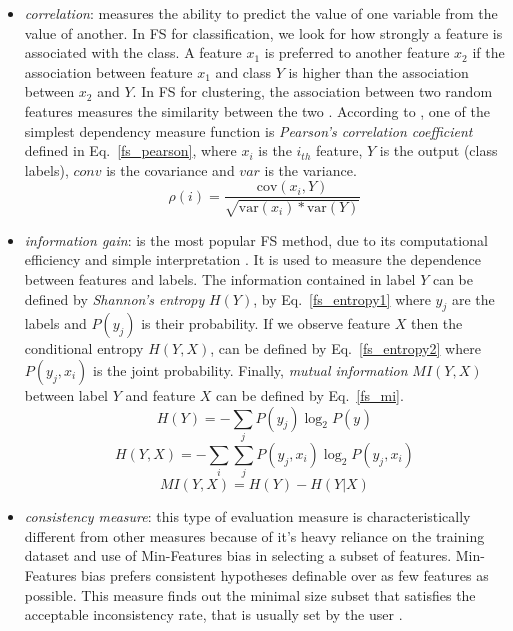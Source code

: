 \begin{itemize}
  \item \textit{correlation}: measures the ability to predict the value of one variable from the value of another. In FS for classification, we look for how strongly a feature is associated with the class. A feature $x_{1}$ is preferred to another feature $x_{2}$ if the association between feature $x_{1}$ and class $Y$ is higher than the association between $x_{2}$ and $Y$. In FS for clustering, the association between two random features measures the similarity between the two \citep{liu2005toward}. According to \citet{guyon2003introduction}, one of the simplest dependency measure function is \textit{Pearson's correlation coefficient} defined in Eq.~\ref{fs_pearson}, where $x_{i}$ is the $i_{th}$ feature, $Y$ is the output (class labels), $conv$ is the covariance and $var$ is the variance.
  \begin{equation}\label{fs_pearson}
    \rho(i) = \frac{\text{cov}(x_{i},Y)}{\sqrt{\text{var}(x_{i})*\text{var}(Y)}}
  \end{equation}
  \item \textit{information gain}: is the most popular FS method, due to its computational efficiency and simple interpretation \citep{tang2014feature}. It is used to measure the dependence between features and labels. The information contained in label $Y$ can be defined by \textit{Shannon's entropy} $H(Y)$, by Eq.~\ref{fs_entropy1} where $y_{j}$ are the labels and $P(y_{j})$ is their probability. If we observe feature $X$ then the conditional entropy $H(Y, X)$, can be defined by Eq.~\ref{fs_entropy2} where $P(y_{j},x_{i})$ is the joint probability. Finally, \textit{mutual information} $MI(Y,X)$ between label $Y$ and feature $X$ can be defined by Eq.~\ref{fs_mi}.
  \begin{equation}\label{fs_entropy1}
    H(Y) = -\sum_j P(y_{j})\log_{2} P(y_{})
  \end{equation}  
  \begin{equation}\label{fs_entropy2}
    H(Y, X) = -\sum_i\sum_j P(y_{j},x_{i})\log_{2}P(y_{j},x_{i})
  \end{equation}
  \begin{equation}\label{fs_mi}
    MI(Y,X) = H(Y) - H(Y|X)
  \end{equation}
  \item \textit{consistency measure}: this type of evaluation measure is characteristically different from other measures because of it's heavy reliance on the training dataset and use of Min-Features bias in selecting a subset of features. Min-Features bias prefers consistent hypotheses definable over as few features as possible. This measure finds out the minimal size subset that satisfies the acceptable inconsistency rate, that is usually set by the user \citep{liu2005toward}.
\end{itemize}

